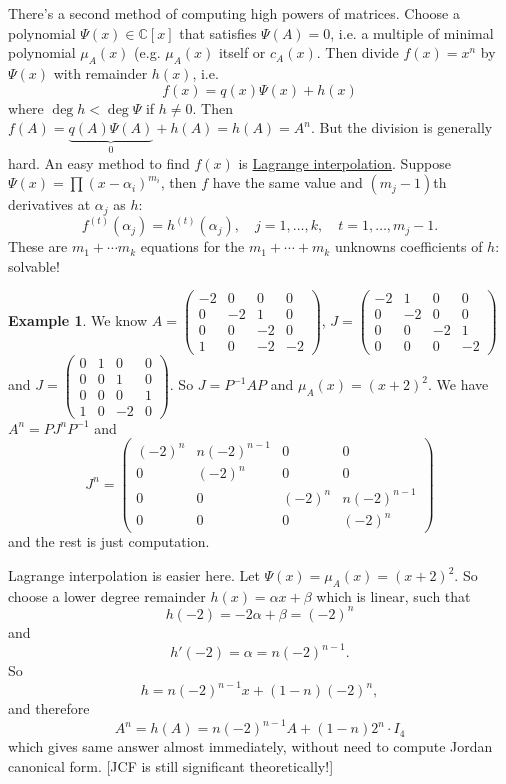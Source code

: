 \documentclass[a4paper]{article}
\theoremstyle{definition}
\newtheorem{example}[defn]{Example}
\begin{document}
There's a second method of computing high powers of matrices. Choose a polynomial $\Psi(x)\in \mathbb C[x]$ that satisfies $\Psi(A)=0$, i.e. a multiple of minimal polynomial $\mu_A(x)$ (e.g. $\mu_A(x)$ itself or $c_A(x)$. Then divide $f(x)=x^n$ by $\Psi(x)$ with remainder $h(x)$, i.e.
\[
f(x)=q(x)\Psi (x)+h(x)
\]
where $\deg h<\deg \Psi$ if $h\neq 0$. Then $f(A)=\underbrace{q(A)\Psi(A)}_0+h(A)=h(A)=A^n$. But the division is generally hard. An easy method to find $f(x)$ is \underline{Lagrange interpolation}. Suppose $\Psi(x)=\prod (x-\alpha_i)^{m_i}$, then $f$ have the same value and $(m_j-1)$th derivatives at $\alpha_j$ as $h$:
\[
f^{(t)}(\alpha_j)=h^{(t)}(\alpha_j),\quad j=1,\ldots,k,\quad t=1,\ldots,m_j-1 .
\]
These are $m_1+\cdots m_k$ equations for the $m_1+\cdots +m_k$ unknowns coefficients of $h$: solvable!
\begin{example}
We know $A=\begin{pmatrix}-2&0&0&0\\0&-2&1&0\\0&0&-2&0\\1&0&-2&-2\end{pmatrix}$, $J=\begin{pmatrix}-2&1&0&0\\0&-2&0&0\\0&0&-2&1\\0&0&0&-2\end{pmatrix}$ and $J=\begin{pmatrix}0&1&0&0\\0&0&1&0\\0&0&0&1\\1&0&-2&0\end{pmatrix}$. So $J=P^{-1}AP$ and $\mu_A(x)=(x+2)^2$. We have $A^n=PJ^nP^{-1}$ and
\[
J^n=\begin{pmatrix}(-2)^n & n(-2)^{n-1} &0 & 0 \\ 0 & (-2)^n & 0&0 \\ 0&0&(-2)^n & n(-2)^{n-1} \\ 0&0&0&(-2)^n\end{pmatrix}
\]
and the rest is just computation.

Lagrange interpolation is easier here. Let $\Psi(x)=\mu_A(x)=(x+2)^2$. So choose a lower degree remainder $h(x)=\alpha x+\beta$ which is linear, such that
\[
h(-2)=-2\alpha+\beta=(-2)^n
\]
and
\[
h'(-2)=\alpha=n(-2)^{n-1} .
\]
So
\[
h=n(-2)^{n-1}x+(1-n)(-2)^n,
\]
and therefore
\[
A^n=h(A)=n(-2)^{n-1}A+(1-n)2^n \cdot I_4
\]
which gives same answer almost immediately, without need to compute Jordan canonical form. [JCF is still significant theoretically!]
\end{example}
\end{document}
